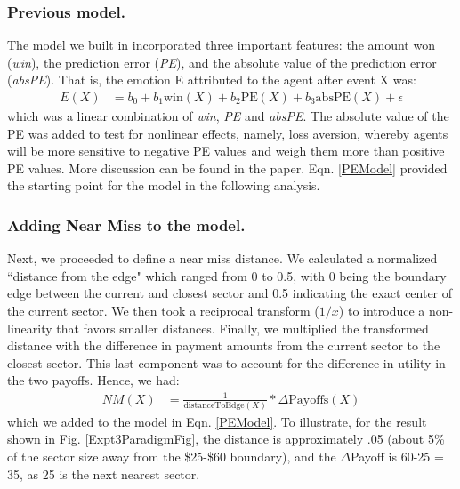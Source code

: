 \documentclass[10pt,letterpaper]{article}
\begin{document}
\subsubsection{Previous model.} The model we built in  incorporated three important features: the amount won (\textit{win}), the prediction error (\textit{PE}), and the absolute value of the prediction error (\textit{absPE}). That is, the emotion E attributed to the agent after event X was:
\begin{align}
E(X) &= b_0 + b_1 \text{win}(X) + b_2 \text{PE}(X) + b_3 \text{absPE}(X) + \epsilon \label{PEModel}
\end{align}
which was a linear combination of \textit{win}, \textit{PE} and \textit{absPE}. The absolute value of the PE was added to test for nonlinear effects, namely, loss aversion, whereby agents will be more sensitive to negative PE values and weigh them more than positive PE values. More discussion can be found in the paper. Eqn. \ref{PEModel} provided the starting point for the model in the following analysis.


\subsubsection{Adding Near Miss to the model.}


Next, we proceeded to define a near miss distance. We calculated a normalized ``distance from the edge" which ranged from 0 to 0.5, with 0 being the boundary edge between the current and closest sector and 0.5 indicating the exact center of the current sector. We then took a reciprocal transform ($1/x$) to introduce a non-linearity that favors smaller distances. Finally, we multiplied the transformed distance with the difference in payment amounts from the current sector to the closest sector. This last component was to account for the difference in utility in the two payoffs. Hence, we had:
\begin{align}
NM(X) &= \frac{1}{\text{distanceToEdge}(X)} * \Delta\text{Payoffs}(X) \label{NMRegressor}
\end{align}
which we added to the model in Eqn. \ref{PEModel}. To illustrate, for the result shown in Fig. \ref{Expt3ParadigmFig}, the distance is approximately .05 (about 5\% of the sector size away from the \$25-\$60 boundary), and the $\Delta$Payoff is 60-25 = 35, as 25 is the next nearest sector.
\end{document}
